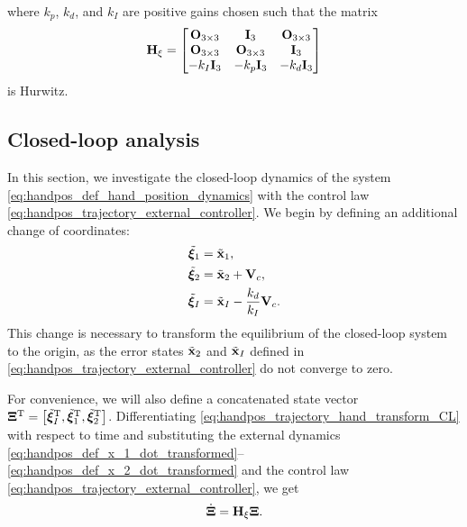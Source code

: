 \noindent where $k_p$, $k_d$, and $k_I$ are positive gains chosen such that the matrix
\begin{equation}
    \mathbf{H}_{\xi}
    =
    \begin{bmatrix}
        \mathbf{O}_{3 \times 3} & \mathbf{I}_{3} & \mathbf{O}_{3 \times 3} \\ \mathbf{O}_{3 \times 3} & \mathbf{O}_{3 \times 3} & \mathbf{I}_{3} \\ -k_I \mathbf{I}_{3} & -k_p \mathbf{I}_{3} & -k_d \mathbf{I}_{3}
    \end{bmatrix} \label{eq:handpos_trajectory_H_xi}
\end{equation}
is Hurwitz.

\subsection{Closed-loop analysis}
In this section, we investigate the closed-loop dynamics of the system \eqref{eq:handpos_def_hand_position_dynamics} with the control law \eqref{eq:handpos_trajectory_external_controller}.
We begin by defining an additional change of coordinates:
\begin{subequations}
    \begin{align}
        \tilde{\bm{\xi}}_1 &= \tilde{\mathbf{x}}_1, \\
        \tilde{\bm{\xi}}_2 &= \tilde{\mathbf{x}}_2 + \mathbf{V}_c, \\
        \tilde{\bm{\xi}}_I &= \tilde{\mathbf{x}}_I - \frac{k_d}{k_I}\mathbf{V}_c.
    \end{align} \label{eq:handpos_trajectory_hand_transform_CL}
\end{subequations}
This change is necessary to transform the equilibrium of the closed-loop system to the origin, as the error states $\tilde{\mathbf{x}}_2$ and $\tilde{\mathbf{x}}_I$ defined in \eqref{eq:handpos_trajectory_external_controller} do not converge to zero.

For convenience, we will also define a concatenated state vector $\bm{\Xi}^{\mathrm{T}} = \left[{\tilde{\bm{\xi}}}_I^{\mathrm{T}}, {\tilde{\bm{\xi}}}_1^{\mathrm{T}}, {\tilde{\bm{\xi}}}_2^{\mathrm{T}}\right]$.
Differentiating \eqref{eq:handpos_trajectory_hand_transform_CL} with respect to time and substituting the external dynamics \eqref{eq:handpos_def_x_1_dot_transformed}--\eqref{eq:handpos_def_x_2_dot_transformed} and the control law \eqref{eq:handpos_trajectory_external_controller}, we get
\begin{equation}
    \dot{\bm{\Xi}} = \mathbf{H}_{\xi} \bm{\Xi}. \label{eq:handpos_trajectory_external_dynamics}
\end{equation}

